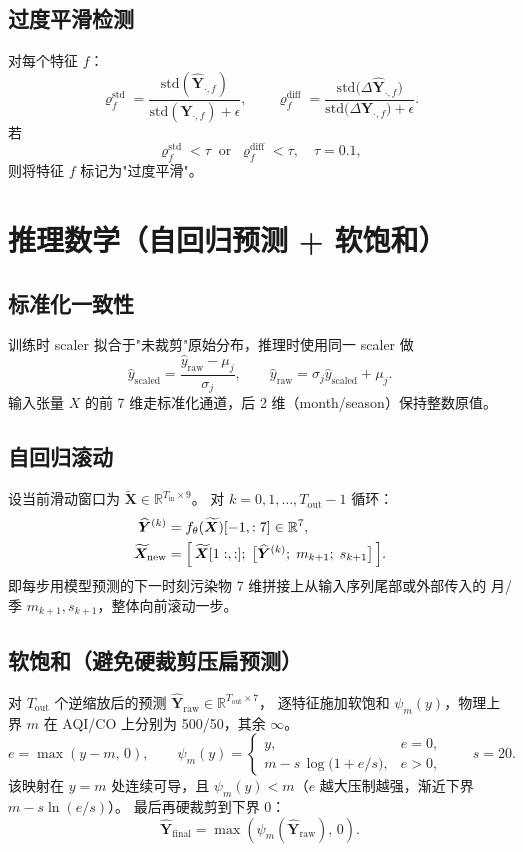 \documentclass[11pt,a4paper]{article}
\newcommand{\R}{\mathbb{R}}
\newcommand{\mat}[1]{\bm{#1}}
\begin{document}
\subsection{过度平滑检测}
对每个特征 $f$：
\[
\varrho_f^{\text{std}} = \frac{\mathrm{std}(\widehat{\mat{Y}}_{\cdot,f})}{\mathrm{std}(\mat{Y}_{\cdot,f}) + \epsilon},\qquad
\varrho_f^{\text{diff}} = \frac{\mathrm{std}\bigl(\Delta\widehat{\mat{Y}}_{\cdot,f}\bigr)}{\mathrm{std}\bigl(\Delta\mat{Y}_{\cdot,f}\bigr) + \epsilon}.
\]
若
\[
\varrho_f^{\text{std}} < \tau \;\; \text{or} \;\; \varrho_f^{\text{diff}} < \tau,\quad \tau = 0.1,
\]
则将特征 $f$ 标记为"过度平滑"。

\section{推理数学（自回归预测 + 软饱和）}

\subsection{标准化一致性}
训练时 scaler 拟合于"未裁剪"原始分布，推理时使用同一 scaler 做
\[
\widehat{y}_{\text{scaled}} = \frac{\widehat{y}_{\text{raw}} - \mu_j}{\sigma_j},\qquad
\widehat{y}_{\text{raw}} = \sigma_j \widehat{y}_{\text{scaled}} + \mu_j.
\]
输入张量 $X$ 的前 7 维走标准化通道，后 2 维（month/season）保持整数原值。

\subsection{自回归滚动}
设当前滑动窗口为 $\widetilde{\mat{X}} \in \R^{T_{\text{in}}\times 9}$。
对 $k = 0, 1, \dots, T_{\text{out}}-1$ 循环：
\begin{align}
\widehat{\mat{Y}}^{(k)} &= f_{\theta}(\widetilde{\mat{X}})[-1, :7] \in \R^{7},\\
\widetilde{\mat{X}}_{\text{new}} &=
\Bigl[\,\widetilde{\mat{X}}[1:, :];\; \bigl[\widehat{\mat{Y}}^{(k)};\; m_{k+1};\; s_{k+1}\bigr]\,\Bigr].
\end{align}
即每步用模型预测的下一时刻污染物 7 维拼接上从输入序列尾部或外部传入的
月/季 $m_{k+1}, s_{k+1}$，整体向前滚动一步。

\subsection{软饱和（避免硬裁剪压扁预测）}
对 $T_{\text{out}}$ 个逆缩放后的预测 $\widehat{\mat{Y}}_{\text{raw}} \in \R^{T_{\text{out}}\times 7}$，
逐特征施加软饱和 $\psi_m(y)$，物理上界 $m$ 在 AQI/CO 上分别为 500/50，其余 $\infty$。
\[
e = \max(y - m,\, 0),\qquad
\psi_m(y) = \begin{cases}
y, & e = 0,\\
m - s\,\log\!\bigl(1 + e/s\bigr), & e > 0,
\end{cases}
\qquad s = 20.
\]
该映射在 $y = m$ 处连续可导，且 $\psi_m(y) < m$（$e$ 越大压制越强，渐近下界 $m - s\ln(e/s)$）。
最后再硬裁剪到下界 0：
\[
\widehat{\mat{Y}}_{\text{final}} = \max(\psi_m(\widehat{\mat{Y}}_{\text{raw}}),\, 0).
\]
\end{document}
